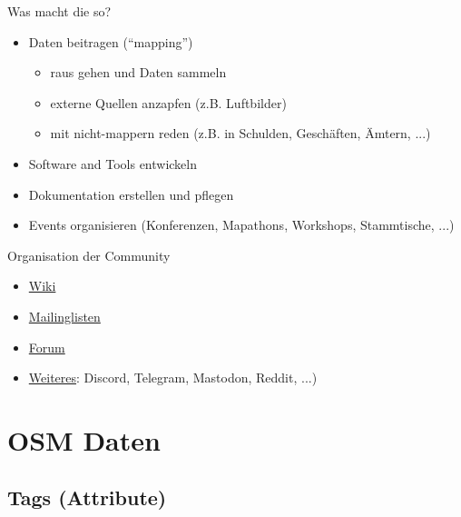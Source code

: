 \documentclass{beamer}
\begin{document}
			\begin{frame}{Was macht die so?}
				\begin{itemize}
					\item Daten beitragen (\enquote{mapping})
					\begin{itemize}
						\item raus gehen und Daten sammeln
						\item externe Quellen anzapfen (z.B. Luftbilder)
						\item mit nicht-mappern reden (z.B. in Schulden, Geschäften, Ämtern, ...)
					\end{itemize}\pause
					\item Software and Tools entwickeln\pause
					\item Dokumentation erstellen und pflegen\pause
					\item Events organisieren (Konferenzen, Mapathons, Workshops, Stammtische, ...)
				\end{itemize}
			\end{frame}
		
			\begin{frame}{Organisation der Community}
				\begin{itemize}
					\item \href{https://wiki.openstreetmap.org/}{Wiki}
					\item \href{https://wiki.openstreetmap.org/wiki/Mailing_lists}{Mailinglisten}
					\item \href{https://community.openstreetmap.org/}{Forum}
					\item \href{https://wiki.openstreetmap.org/wiki/Contact_channels}{Weiteres}: Discord, Telegram, Mastodon, Reddit, ...)
				\end{itemize}
			\end{frame}

	\section{OSM Daten}
		
		\begin{frame}
			\tableofcontents[currentsection]
		\end{frame}
		
		\subsection{Tags (Attribute)}
		
\end{document}
